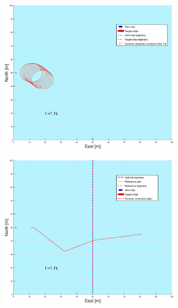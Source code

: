 \begin{figure}[ht!] %
    \begin{subfigure}[b]{0.49\textwidth}
        \centering
        \includegraphics[width=\textwidth]{Images/Figures/enkel_SO/_Simple_0fig1_time=1}
    \end{subfigure}
    \hfill
    \begin{subfigure}[b]{0.499\textwidth}
        \centering
        \includegraphics[width=\textwidth]{Images/Figures/enkel_SO/_Simple_0fig999_time=1}

\end{subfigure}
\end{figure}

